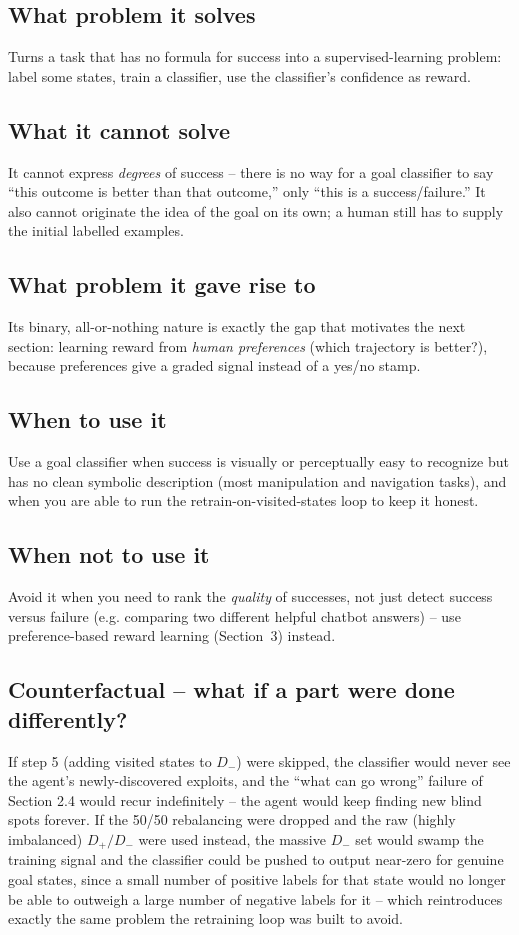 \documentclass[11pt]{article}
\begin{document}
\subsection{What problem it solves}
Turns a task that has no formula for success into a supervised-learning problem:
label some states, train a classifier, use the classifier's confidence as reward.

\subsection{What it cannot solve}
It cannot express \emph{degrees} of success -- there is no way for a goal
classifier to say ``this outcome is better than that outcome,'' only ``this is a
success/failure.'' It also cannot originate the idea of the goal on its own; a
human still has to supply the initial labelled examples.

\subsection{What problem it gave rise to}
Its binary, all-or-nothing nature is exactly the gap that motivates the next
section: learning reward from \emph{human preferences} (which trajectory is
better?), because preferences give a graded signal instead of a yes/no stamp.

\subsection{When to use it}
Use a goal classifier when success is visually or perceptually easy to recognize
but has no clean symbolic description (most manipulation and navigation tasks),
and when you are able to run the retrain-on-visited-states loop to keep it honest.

\subsection{When not to use it}
Avoid it when you need to rank the \emph{quality} of successes, not just detect
success versus failure (e.g. comparing two different helpful chatbot answers) --
use preference-based reward learning (Section~3) instead.

\subsection{Counterfactual -- what if a part were done differently?}
If step 5 (adding visited states to $D_-$) were skipped, the classifier would
never see the agent's newly-discovered exploits, and the ``what can go wrong''
failure of Section 2.4 would recur indefinitely -- the agent would keep finding
new blind spots forever. If the 50/50 rebalancing were dropped and the raw
(highly imbalanced) $D_+ / D_-$ were used instead, the massive $D_-$ set would
swamp the training signal and the classifier could be pushed to output near-zero
for genuine goal states, since a small number of positive labels for that state
would no longer be able to outweigh a large number of negative labels for it --
which reintroduces exactly the same problem the retraining loop was built to
avoid.
\end{document}
